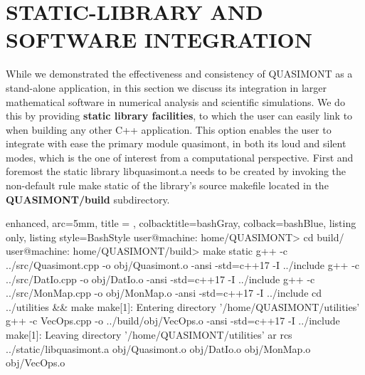 \documentclass[a4paper, twosided]{book}
\begin{document}
\newpage
\section[Static-library and software integration]{\changefont STATIC-LIBRARY AND SOFTWARE INTEGRATION}\label{Sec3.3}

\noindent
While we demonstrated the effectiveness and consistency of QUASIMONT as a stand-alone application, in this section we discuss its integration in larger mathematical software in numerical analysis and scientific simulations. We do this by providing \color{poliDarkBlue} \textbf{static library facilities}\color{black}, to which the user can easily link to when building any other C++ application. This option enables the user to integrate with ease the primary module \colorbox{poliGrayBlue}{quasimont}, in both its loud and silent modes, which is the one of interest from a computational perspective. First and foremost the static library \colorbox{poliGrayBlue}{libquasimont.a} needs to be created by invoking the non-default rule \colorbox{poliGrayBlue}{make static} of the library's source \colorbox{poliGrayBlue}{makefile} located in the \colorbox{poliGrayBlue}{\textbf{QUASIMONT/build}} subdirectory.

\vspace{0.2cm}
\begin{tcblisting}{enhanced,
                   arc=5mm,
                   title = \color{black}{\large \ttfamily Creation of libquasimont static library},
                   colbacktitle=bashGray,
                   colback=bashBlue,
                   listing only,
                   listing style=BashStyle}
user@machine: home/QUASIMONT> cd build/
user@machine: home/QUASIMONT/build> make static
g++ -c ../src/Quasimont.cpp -o obj/Quasimont.o -ansi -std=c++17 -I ../include 
g++ -c ../src/DatIo.cpp -o obj/DatIo.o -ansi -std=c++17 -I ../include 
g++ -c ../src/MonMap.cpp -o obj/MonMap.o -ansi -std=c++17 -I ../include 
cd ../utilities && make
make[1]: Entering directory '/home/QUASIMONT/utilities'
g++ -c VecOps.cpp -o ../build/obj/VecOps.o -ansi -std=c++17 -I ../include 
make[1]: Leaving directory '/home/QUASIMONT/utilities'
ar rcs ../static/libquasimont.a obj/Quasimont.o obj/DatIo.o obj/MonMap.o obj/VecOps.o
\end{tcblisting}
\vspace{0.3cm}
\end{document}
